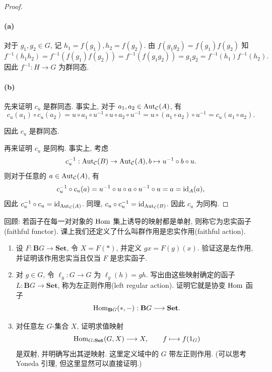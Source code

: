 \documentclass{article}
\begin{document}
\begin{proof}
	\paragraph{(a)} 对于 $g_1, g_2 \in G$, 记 $h_1 = f(g_1), h_2 = f(g_2)$. 由 $f(g_1g_2) = f(g_1) f(g_2)$ 知 
	\[ f^{-1}(h_1h_2) = f^{-1}(f(g_1)f(g_2)) = f^{-1}(f(g_1g_2)) = g_1g_2 = f^{-1}(h_1) f^{-1}(h_2). \]
	因此 $f^{-1}: H \to G$ 为群同态.

	\paragraph{(b)} 先来证明 $c_u$ 是群同态. 事实上, 对于 $a_1, a_2 \in \operatorname{Aut}_{\mathcal{C}}(A)$, 有
	\[ c_u(a_1) \circ c_u(a_2) = u \circ a_1 \circ u^{-1} \circ u \circ a_2 \circ u^{-1} = u \circ (a_1 \circ a_2) \circ u^{-1} = c_u (a_1 \circ a_2). \]

	因此 $c_u$ 是群同态.

	再来证明 $c_u$ 是同构. 事实上, 考虑 
	\[ c_u^{-1}: \operatorname{Aut}_{\mathcal{C}}(B) \to \operatorname{Aut}_{\mathcal{C}}(A), b \mapsto u^{-1} \circ b \circ u. \]
	则对于任意的 $a \in \operatorname{Aut}_{\mathcal{C}}(A)$, 有 
	\[ c_u^{-1} \circ c_u (a) = u^{-1} \circ u \circ a \circ u^{-1} \circ u = a = \operatorname{id}_A(a), \]
	因此 $c_u^{-1} \circ c_u = \operatorname{id}_{\operatorname{Aut}_{\mathcal{C}}(A)}$. 同理, $c_u \circ c_u^{-1} = \operatorname{id}_{\operatorname{Aut}_{\mathcal{C}}(B)}$. 因此 $c_u$ 为同构.
\end{proof}



\begin{problem}
  回顾: 若函子在每一对对象的 $\operatorname{Hom}$ 集上诱导的映射都是单射, 则称它为忠实函子(faithful functor). 课上我们还定义了什么叫群作用是忠实作用(faithful action).
  \begin{enumerate}
    \item[(a)] 设 $F:\mathbf{B}G\to\mathbf{Set}$, 令 $X=F(*)$, 并定义 $gx=F(g)(x)$. 验证这是左作用, 并证明该作用忠实当且仅当 $F$ 是忠实函子.
    \item[(b)] 对 $g\in G$, 令 $\ell_g:G\to G$ 为 $\ell_g(h)=gh$. 写出由这些映射确定的函子 $L:\mathbf{B}G\to\mathbf{Set}$, 称为左正则作用(left regular action). 证明它就是协变 $\operatorname{Hom}$ 函子
      \[
        \operatorname{Hom}_{\mathbf{B}G}(*,-):\mathbf{B}G\longrightarrow\mathbf{Set}.
      \]
    \item[(c)] 对任意左 $G$-集合 $X$, 证明求值映射
      \[
        \operatorname{Hom}_{G\text{-}\mathbf{Set}}(G,X)\longrightarrow X,\qquad
        f\longmapsto f(1_G)
      \]
      是双射, 并明确写出其逆映射. 这里定义域中的 $G$ 带左正则作用. (可以思考 Yoneda 引理, 但这里显然可以直接证明.)
  \end{enumerate}
\end{problem}
\end{document}
